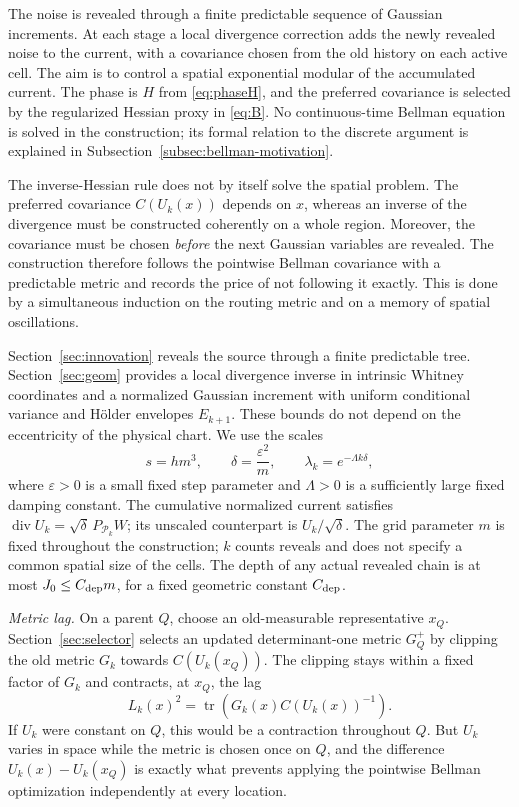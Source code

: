 \documentclass[11pt]{article}
\theoremstyle{definition}
\theoremstyle{remark}
\numberwithin{equation}{section}
\newcommand{\pr}{\mathcal P}
\newcommand{\divv}{\operatorname{div}}
\begin{document}
The noise is revealed through a finite predictable sequence of
Gaussian increments. At each stage a local divergence correction adds
the newly revealed noise to the current, with a covariance chosen from
the old history on each active cell. The aim is to control a spatial
exponential modular of the accumulated current. The phase is $H$ from
\eqref{eq:phaseH}, and the preferred covariance is selected by the
regularized Hessian proxy in \eqref{eq:B}. No continuous-time Bellman
equation is solved in the construction; its formal relation to the
discrete argument is explained in
Subsection~\ref{subsec:bellman-motivation}.

The inverse-Hessian rule does not by itself solve the spatial
problem. The preferred covariance $C(U_k(x))$ depends on $x$, whereas
an inverse of the divergence must be constructed coherently on a
whole region. Moreover, the covariance must be chosen \emph{before}
the next Gaussian variables are revealed. The construction therefore
follows the pointwise Bellman covariance with a predictable metric and
records the price of not following it exactly. This is done by a
simultaneous induction on the routing metric and on a memory of
spatial oscillations.

Section~\ref{sec:innovation} reveals the source through a finite
predictable tree. Section~\ref{sec:geom} provides a local divergence
inverse in intrinsic Whitney coordinates and a normalized Gaussian
increment with uniform conditional variance and H\"older envelopes
$E_{k+1}$. These bounds do not depend on the eccentricity of the
physical chart. We use the scales
\begin{equation}\label{eq:parameters}
 s=hm^3,\qquad \delta=\frac{\varepsilon^2}{m},\qquad
 \lambda_k=e^{-\Lambda k\delta},
\end{equation}
where $\varepsilon>0$ is a small fixed step parameter and $\Lambda>0$
is a sufficiently large fixed damping constant. The cumulative
normalized current satisfies $\divv U_k=\sqrt\delta\,P_{\pr_k}W$;
its unscaled counterpart is $U_k/\sqrt\delta$. The grid parameter
$m$ is fixed throughout the construction; $k$ counts reveals
and does not specify a common spatial size of the cells.
\label{not:depthbound}
The depth of any actual revealed chain is at most
$J_0\le C_{\rm dep}m$, for a fixed geometric constant
$C_{\rm dep}$.

\emph{Metric lag.}
On a parent $Q$, choose an old-measurable representative $x_Q$.
Section~\ref{sec:selector} selects an updated determinant-one
metric $G_Q^+$ by clipping the old metric $G_k$ towards
$C(U_k(x_Q))$. The clipping stays within a fixed factor of $G_k$
and contracts, at $x_Q$, the lag
\[
 L_k(x)^2=\operatorname{tr}\!\left(G_k(x)
                      C(U_k(x))^{-1}\right).
\]
If $U_k$ were constant on $Q$, this would be a contraction
throughout $Q$. But $U_k$ varies in space while the metric is chosen
once on $Q$, and the difference $U_k(x)-U_k(x_Q)$ is exactly what
prevents applying the pointwise Bellman optimization independently
at every location.
\end{document}
